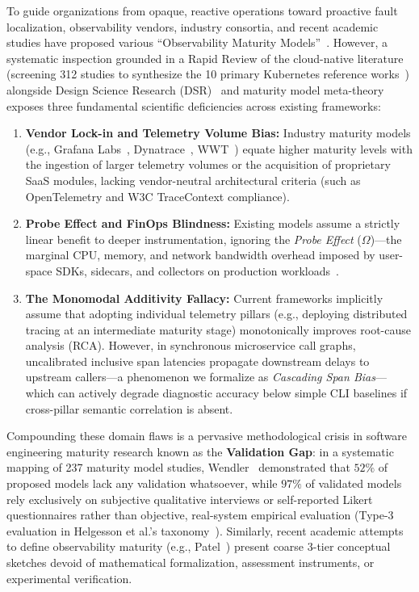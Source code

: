 To guide organizations from opaque, reactive operations toward proactive fault localization, observability vendors, industry consortia, and recent academic studies have proposed various ``Observability Maturity Models''~\cite{grafana_omm_2024, dynatrace_omm_2024, wwt_omm_2025, patel_2025}. However, a systematic inspection grounded in a Rapid Review of the cloud-native literature~\cite{cartaxo_2018} (screening 312 studies to synthesize the 10 primary Kubernetes reference works~\cite{kosinska_2023, usman_2022, faseeha_2025, araujo_2024, hartikainen_2024, gomes_2025, han_2024, deng_2024, zanatta_23, wei_2025}) alongside Design Science Research (DSR)~\cite{hevner_2004, becker_2009} and maturity model meta-theory~\cite{debruin_2005, wendler_2012, lasrado_2015} exposes three fundamental scientific deficiencies across existing frameworks:
\begin{enumerate}[leftmargin=*, nosep, label=(\roman*)]
    \item \textbf{Vendor Lock-in and Telemetry Volume Bias:} Industry maturity models (e.g., Grafana Labs~\cite{grafana_omm_2024}, Dynatrace~\cite{dynatrace_omm_2024}, WWT~\cite{wwt_omm_2025}) equate higher maturity levels with the ingestion of larger telemetry volumes or the acquisition of proprietary SaaS modules, lacking vendor-neutral architectural criteria (such as OpenTelemetry and W3C TraceContext compliance).
    \item \textbf{Probe Effect and FinOps Blindness:} Existing models assume a strictly linear benefit to deeper instrumentation, ignoring the \textit{Probe Effect} ($\Omega$)---the marginal CPU, memory, and network bandwidth overhead imposed by user-space SDKs, sidecars, and collectors on production workloads~\cite{agarwal_2022, valbusa_2025}.
    \item \textbf{The Monomodal Additivity Fallacy:} Current frameworks implicitly assume that adopting individual telemetry pillars (e.g., deploying distributed tracing at an intermediate maturity stage) monotonically improves root-cause analysis (RCA). However, in synchronous microservice call graphs, uncalibrated inclusive span latencies propagate downstream delays to upstream callers---a phenomenon we formalize as \textit{Cascading Span Bias}---which can actively degrade diagnostic accuracy below simple CLI baselines if cross-pillar semantic correlation is absent.
\end{enumerate}

Compounding these domain flaws is a pervasive methodological crisis in software engineering maturity research known as the \textbf{Validation Gap}: in a systematic mapping of 237 maturity model studies, Wendler~\cite{wendler_2012} demonstrated that $52\%$ of proposed models lack any validation whatsoever, while $97\%$ of validated models rely exclusively on subjective qualitative interviews or self-reported Likert questionnaires rather than objective, real-system empirical evaluation (Type-3 evaluation in Helgesson et al.'s taxonomy~\cite{helgesson_2012}). Similarly, recent academic attempts to define observability maturity (e.g., Patel~\cite{patel_2025}) present coarse 3-tier conceptual sketches devoid of mathematical formalization, assessment instruments, or experimental verification.

